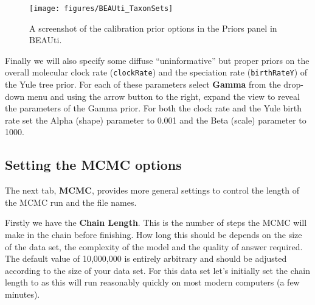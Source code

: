 \documentclass[11pt]{article}
\newcommand{\TODO}[1]{}
\theoremstyle{plain}%
\theoremstyle{definition}
\theoremstyle{remark}
\begin{document}
\begin{figure}
\texttt{[image: figures/BEAUti\_TaxonSets]}
\caption{A screenshot of the calibration prior options in the Priors panel in BEAUti.}
\label{fig:BEAUti_TaxonSets}
\end{figure}

Finally we will also specify some diffuse ``uninformative'' but proper priors on the overall molecular clock rate (\texttt{clockRate}) and the speciation rate (\texttt{birthRateY}) of the Yule tree prior. For each of these parameters select \textbf{Gamma} from the drop-down menu and using the arrow button to the right, expand the view to reveal the parameters of the Gamma prior. For both the clock rate and the Yule birth rate set the Alpha (shape) parameter to 0.001 and the Beta (scale) parameter to 1000.




\subsection{Setting the MCMC options}


The next tab, {\bf MCMC}, provides more general
settings to control the length of the MCMC run and the file names. 

Firstly we have the \textbf{Chain Length}. This is the number of
steps the MCMC will make in the chain before finishing. How long this
should be depends on the size of the data set, the complexity of the
model and the quality of answer required. The default value of 10,000,000
is entirely arbitrary and should be adjusted according to the size
of your data set. For this data set let's initially set the chain
length to \chainLength{} as this will run reasonably quickly on most modern
computers (a few minutes).
\end{document}
